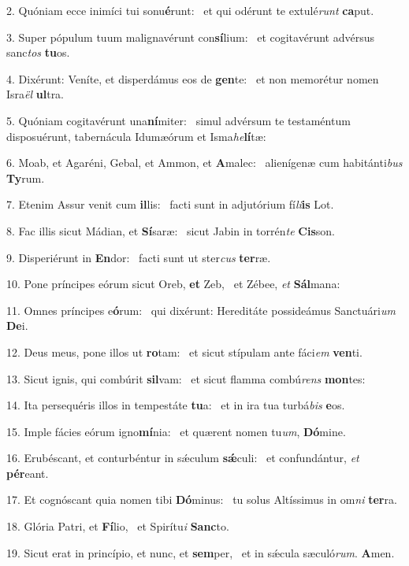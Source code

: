 2. Quóniam ecce inimíci tui sonu\textbf{é}runt: \ast\  et qui odérunt te extulé\textit{runt} \textbf{ca}put.\

3. Super pópulum tuum malignavérunt con\textbf{sí}lium: \ast\  et cogitavérunt advérsus sanc\textit{tos} \textbf{tu}os.\

4. Dixérunt: Veníte, et disperdámus eos de \textbf{gen}te: \ast\  et non memorétur nomen Isra\textit{ël} \textbf{ul}tra.\

5. Quóniam cogitavérunt una\textbf{ní}miter: \ast\  simul advérsum te testaméntum disposuérunt, tabernácula Idumæórum et Isma\textit{he}\textbf{lí}tæ:\

6. Moab, et Agaréni, Gebal, et Ammon, et \textbf{A}malec: \ast\  alienígenæ cum habitánti\textit{bus} \textbf{Ty}rum.\

7. Etenim Assur venit cum \textbf{il}lis: \ast\  facti sunt in adjutórium fí\textit{li}\textbf{is} Lot.\

8. Fac illis sicut Mádian, et \textbf{Sí}saræ: \ast\  sicut Jabin in torrén\textit{te} \textbf{Cis}son.\

9. Disperiérunt in \textbf{En}dor: \ast\  facti sunt ut ster\textit{cus} \textbf{ter}ræ.\

10. Pone príncipes eórum sicut Oreb, \textbf{et} Zeb, \ast\  et Zébee, \textit{et} \textbf{Sál}mana:\

11. Omnes príncipes e\textbf{ó}rum: \ast\  qui dixérunt: Hereditáte possideámus Sanctuári\textit{um} \textbf{De}i.\

12. Deus meus, pone illos ut \textbf{ro}tam: \ast\  et sicut stípulam ante fáci\textit{em} \textbf{ven}ti.\

13. Sicut ignis, qui combúrit \textbf{sil}vam: \ast\  et sicut flamma combú\textit{rens} \textbf{mon}tes:\

14. Ita persequéris illos in tempestáte \textbf{tu}a: \ast\  et in ira tua turbá\textit{bis} \textbf{e}os.\

15. Imple fácies eórum igno\textbf{mí}nia: \ast\  et quærent nomen tu\textit{um}, \textbf{Dó}mine.\

16. Erubéscant, et conturbéntur in sǽculum \textbf{sǽ}culi: \ast\  et confundántur, \textit{et} \textbf{pér}eant.\

17. Et cognóscant quia nomen tibi \textbf{Dó}minus: \ast\  tu solus Altíssimus in om\textit{ni} \textbf{ter}ra.\

18. Glória Patri, et \textbf{Fí}lio, \ast\  et Spirítu\textit{i} \textbf{Sanc}to.\

19. Sicut erat in princípio, et nunc, et \textbf{sem}per, \ast\  et in sǽcula sæculó\textit{rum}. \textbf{A}men.\

